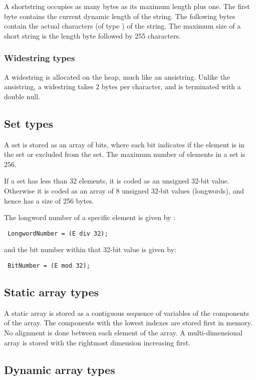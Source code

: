 A shortstring occupies as many bytes as its maximum length plus one.
The first byte contains the current dynamic length of the string. The
following bytes contain the actual characters (of type )
of the string. The maximum size of a short string is the length
byte followed by 255 characters.

\subsubsection{Widestring types}

A widestring is allocated on the heap, much like an ansistring. Unlike the
ansistring, a widestring takes 2 bytes per character, and is terminated with
a double null. 

\subsection{Set types}

A set is stored as an array of bits, where each bit indicates
if the element is in the set or excluded from the set. The maximum
number of elements in a set is 256.

If a set has less than 32 elements, it is coded as an unsigned
32-bit value. Otherwise it is coded as an array of 8 
unsigned 32-bit values (longwords), and hence has a size of 256 bytes.

The longword number of a specific element  is given by :

\begin{verbatim}
 LongwordNumber = (E div 32);
\end{verbatim}

and the bit number within that 32-bit value is given by:
\begin{verbatim}
 BitNumber = (E mod 32);
\end{verbatim}

\subsection{Static array types}

A static array is stored as a contiguous sequence of variables
of the components of the array. The components with the
lowest indexes are stored first in memory. No alignment
is done between each element of the array. A multi-dimensional
array is stored with the rightmost dimension increasing first.

\subsection{Dynamic array types}

